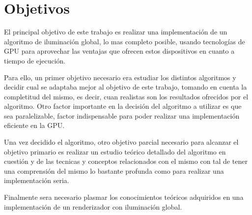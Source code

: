 \clearpage

\section{Objetivos}

El principal objetivo de este trabajo es realizar una implementación de un algoritmo de iluminación global, lo mas completo posible, usando tecnologías de GPU para aprovechar las ventajas que ofrecen estos dispositivos en cuanto a tiempo de ejecución.

\medskip

Para ello, un primer objetivo necesario era estudiar los distintos algoritmos y decidir cual se adaptaba mejor al objetivo de este trabajo, tomando en cuenta la completitud del mismo, es decir, cuan realistas son los resultados ofrecidos por el algoritmo. Otro factor importante en la decisión del algoritmo a utilizar es que sea paralelizable, factor indispensable para poder realizar una implementación eficiente en la GPU.

\medskip

Una vez decidido el algoritmo, otro objetivo parcial necesario para alcanzar el objetivo primario es realizar un estudio teórico detallado del algoritmo en cuestión y de las tecnicas y conceptos relacionados con el mismo con tal de tener una comprensión del mismo lo bastante profunda como para realizar una implementación seria.

\medskip

Finalmente sera necesario plasmar los conocimientos teóricos adquiridos en una implementación de un renderizador con iluminación global. 




